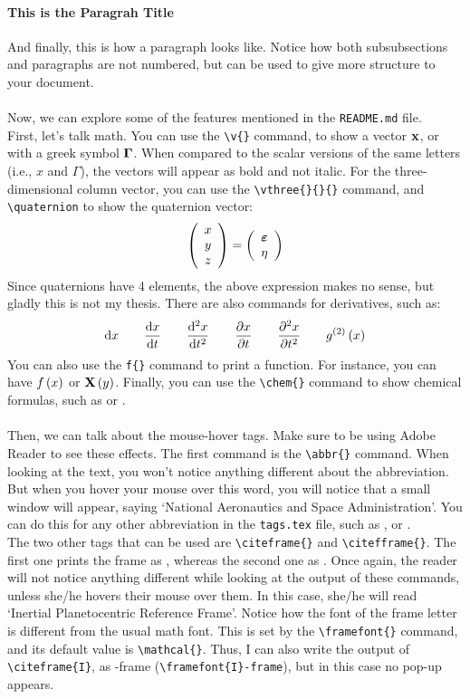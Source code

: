 \paragraph{This is the Paragrah Title} And finally, this is how a paragraph looks like. Notice how both subsubsections and paragraphs are not numbered, but can be used to give more structure to your document. \\
\\
Now, we can explore some of the features mentioned in the \texttt{README.md} file. \\
\indent First, let's talk math. You can use the \verb|\v{}| command, to show a vector $\v{x}$, or with a greek symbol $\v{\Gamma}$. When compared to the scalar versions of the same letters (i.e., $x$ and $\Gamma$), the vectors will appear as bold and not italic. For the three-dimensional column vector, you can use the \verb|\vthree{}{}{}| command, and \verb|\quaternion| to show the quaternion vector:
\[ \vthree{x}{y}{z} = \quaternion \]
Since quaternions have 4 elements, the above expression makes no sense, but gladly this is not my thesis. There are also commands for derivatives, such as:
\[ \dif{x} \qquad \d{x}{t} \qquad \dd{x}{t} \qquad \pd{x}{t} \qquad \pdd{x}{t} \qquad \dpar{g}{x}{2} \]
You can also use the \verb|f{}| command to print a function. For instance, you can have $\f{f}{x}$ or $\f{\v{X}}{y}$. Finally, you can use the \verb|\chem{}| command to show chemical formulas, such as  or . \\
\\
Then, we can talk about the mouse-hover tags. Make sure to be using Adobe Reader to see these effects. The first command is the \verb|\abbr{}| command. When looking at the text, you won't notice anything different about the  abbreviation. But when you hover your mouse over this word, you will notice that a small window will appear, saying `National Aeronautics and Space Administration'. You can do this for any other abbreviation in the \texttt{tags.tex} file, such as ,  or . \\
\indent The two other tags that can be used are \verb|\citeframe{}| and \verb|\citefframe{}|. The first one prints the frame as , whereas the second one as . Once again, the reader will not notice anything different while looking at the output of these commands, unless she/he hovers their mouse over them. In this case, she/he will read `Inertial Planetocentric Reference Frame'. Notice how the font of the frame letter is different from the usual math font. This is set by the \verb|\framefont{}| command, and its default value is \verb|\mathcal{}|. Thus, I can also write the output of \verb|\citeframe{I}|, as -frame (\verb|\framefont{I}-frame|), but in this case no pop-up appears. 

